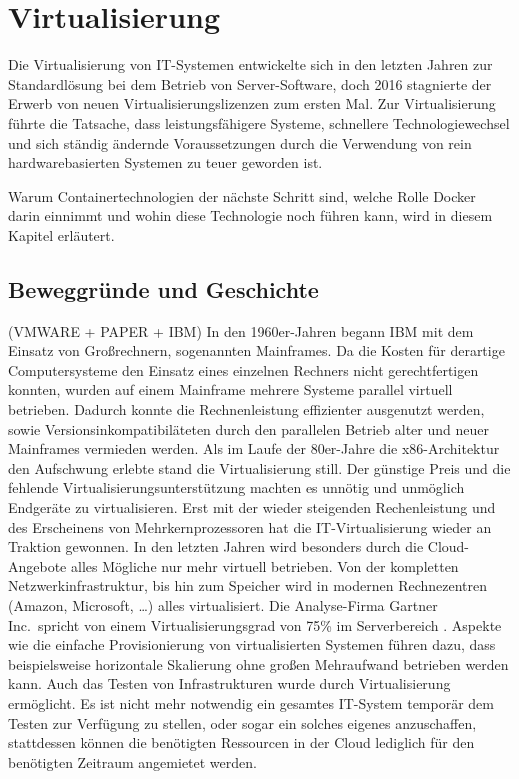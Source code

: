 \chapter{Virtualisierung}
\label{cha:virtualisierung}
Die Virtualisierung von IT-Systemen entwickelte sich in den letzten Jahren zur Standardlösung bei dem Betrieb von Server-Software, doch 2016 stagnierte der Erwerb von neuen Virtualisierungslizenzen zum ersten Mal. \autocite{Gartner-Magic-Quadrant2016:online}
Zur Virtualisierung führte die Tatsache, dass leistungsfähigere Systeme, schnellere Technologiewechsel und sich ständig ändernde Voraussetzungen durch die Verwendung von rein hardwarebasierten Systemen zu teuer geworden ist.~\autocite{vmware-virtualization-history:online}

Warum Containertechnologien der nächste Schritt sind, welche Rolle Docker darin einnimmt und wohin diese Technologie noch führen kann, wird in diesem Kapitel erläutert.
\section{Beweggründe und Geschichte}
\label{sec:virtualisierungsgeschichte}
(VMWARE + PAPER + IBM) In den 1960er-Jahren begann IBM mit dem Einsatz von Großrechnern, sogenannten Mainframes.
Da die Kosten für derartige Computersysteme den Einsatz eines einzelnen Rechners nicht gerechtfertigen konnten, wurden auf einem Mainframe mehrere Systeme parallel virtuell betrieben.
Dadurch konnte die Rechnenleistung effizienter ausgenutzt werden, sowie Versionsinkompatibiläteten durch den parallelen Betrieb alter und neuer Mainframes vermieden werden.
Als im Laufe der 80er-Jahre die x86-Architektur den Aufschwung erlebte stand die Virtualisierung still.
Der günstige Preis und die fehlende Virtualisierungsunterstützung machten es unnötig und unmöglich Endgeräte zu virtualisieren.
Erst mit der wieder steigenden Rechenleistung und des Erscheinens von Mehrkernprozessoren hat die IT-Virtualisierung wieder an Traktion gewonnen.
In den letzten Jahren wird besonders durch die Cloud-Angebote alles Mögliche nur mehr virtuell betrieben.
Von der  kompletten Netzwerkinfrastruktur, bis hin zum Speicher wird in modernen Rechnezentren (Amazon, Microsoft, \dots) alles virtualisiert.
Die Analyse-Firma Gartner Inc.\ spricht von einem Virtualisierungsgrad von 75\% im Serverbereich \autocite{Gartner-Server-Virtualization:online}.
Aspekte wie die einfache Provisionierung von virtualisierten Systemen führen dazu, dass beispielsweise horizontale Skalierung ohne großen Mehraufwand betrieben werden kann.
Auch das Testen von Infrastrukturen wurde durch Virtualisierung ermöglicht.
Es ist nicht mehr notwendig ein gesamtes IT-System temporär dem Testen zur Verfügung zu stellen, oder sogar ein solches eigenes anzuschaffen, stattdessen können die benötigten Ressourcen in der Cloud lediglich für den benötigten Zeitraum angemietet werden.
